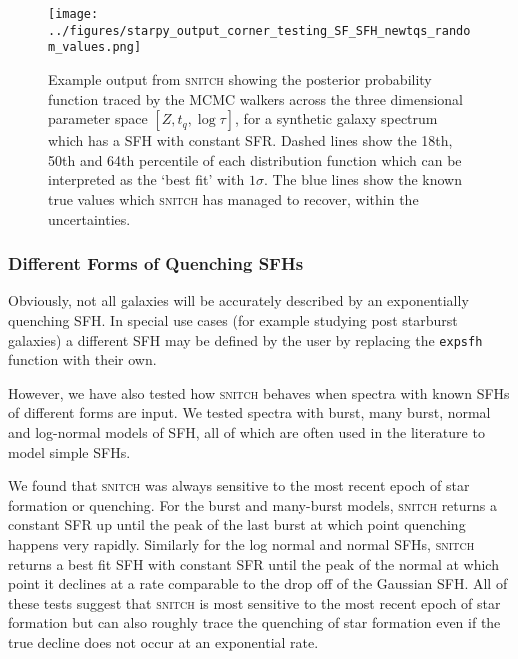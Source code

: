\documentclass[useAMS,usenatbib]{mn2e}
\begin{document}
\begin{figure}
\centering
\texttt{[image: ../figures/starpy\_output\_corner\_testing\_SF\_SFH\_newtqs\_random\_values.png]}
\caption{Example output from \textsc{snitch} showing the posterior probability function traced by the MCMC walkers across the three dimensional parameter space $[Z,t_q,\log \tau]$, for a synthetic galaxy spectrum which has a SFH with constant SFR.  Dashed lines show the 18th, 50th and 64th percentile of each distribution function which can be interpreted as the `best fit' with $1\sigma$. The blue lines show the known true values which \textsc{snitch} has managed to recover, within the uncertainties. }
\label{fig:sfgal}
\end{figure}


\subsubsection{Different Forms of Quenching SFHs}

Obviously, not all galaxies will be accurately described by an exponentially quenching SFH. In special use cases (for example studying post starburst galaxies) a different SFH may be defined by the user by replacing the \texttt{expsfh} function with their own. 

However, we have also tested how \textsc{snitch} behaves when spectra with known SFHs of different forms are input. We tested spectra with burst, many burst, normal and log-normal models of SFH, all of which are often used in the literature to model simple SFHs. 

We found that \textsc{snitch} was always sensitive to the most recent epoch of star formation or quenching. For the burst and many-burst models, \textsc{snitch} returns a constant SFR up until the peak of the last burst at which point quenching happens very rapidly. Similarly for the log normal and normal SFHs, \textsc{snitch} returns a best fit SFH with constant SFR until the peak of the normal at which point it declines at a rate comparable to the drop off of the Gaussian SFH. All of these tests suggest that \textsc{snitch} is most sensitive to the most recent epoch of star formation but can also roughly trace the quenching of star formation even if the true decline does not occur at an exponential rate. 

\end{document}
